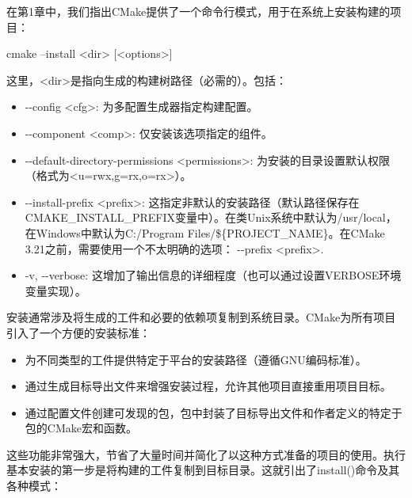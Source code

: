
在第1章中，我们指出CMake提供了一个命令行模式，用于在系统上安装构建的项目：

\begin{shell}
cmake --install <dir> [<options>]
\end{shell}

这里，<dir>是指向生成的构建树路径（必需的）。包括：

\begin{itemize}
\item
-{}-config <cfg>: 为多配置生成器指定构建配置。

\item
-{}-component <comp>: 仅安装该选项指定的组件。

\item
-{}-default-directory-permissions <permissions>: 为安装的目录设置默认权限（格式为<u=rwx,g=rx,o=rx>）。

\item
-{}-install-prefix <prefix>: 这指定非默认的安装路径（默认路径保存在CMAKE\_INSTALL\_PREFIX变量中）。在类Unix系统中默认为/usr/local，在Windows中默认为C:/Program Files/\$\{PROJECT\_NAME\}。在CMake 3.21之前，需要使用一个不太明确的选项： -{}-prefix <prefix>.

\item
-v, -{}-verbose: 这增加了输出信息的详细程度（也可以通过设置VERBOSE环境变量实现）。
\end{itemize}

安装通常涉及将生成的工件和必要的依赖项复制到系统目录。CMake为所有项目引入了一个方便的安装标准：

\begin{itemize}
\item
为不同类型的工件提供特定于平台的安装路径（遵循GNU编码标准）。

\item
通过生成目标导出文件来增强安装过程，允许其他项目直接重用项目目标。

\item
通过配置文件创建可发现的包，包中封装了目标导出文件和作者定义的特定于包的CMake宏和函数。
\end{itemize}

这些功能非常强大，节省了大量时间并简化了以这种方式准备的项目的使用。执行基本安装的第一步是将构建的工件复制到目标目录。这就引出了install()命令及其各种模式：

